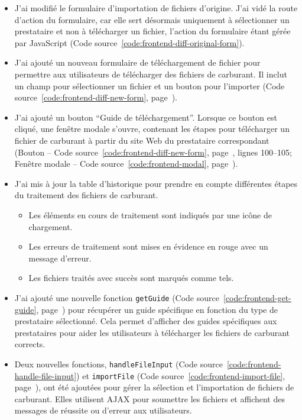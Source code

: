 \begin{itemize}
    \item J'ai modifié le formulaire d'importation de fichiers d'origine. J'ai vidé la route d'action du formulaire, car elle sert désormais uniquement à sélectionner un prestataire et non à télécharger un fichier, l'action du formulaire étant gérée par JavaScript (Code source~\ref{code:frontend-diff-original-form}).
    \item J'ai ajouté un nouveau formulaire de téléchargement de fichier pour permettre aux utilisateurs de télécharger des fichiers de carburant. Il inclut un champ pour sélectionner un fichier et un bouton pour l'importer (Code source~\ref{code:frontend-diff-new-form}, page~\pageref{code:frontend-diff-new-form}).
    \item J'ai ajouté un bouton \foreignquote{french}{Guide de téléchargement}. Lorsque ce bouton est cliqué, une fenêtre modale s'ouvre, contenant les étapes pour télécharger un fichier de carburant à partir du site Web du prestataire correspondant (Bouton -- Code source~\ref{code:frontend-diff-new-form}, page~\pageref{code:frontend-diff-new-form}, lignes 100--105; Fenêtre modale -- Code source~\ref{code:frontend-modal}, page~\pageref{code:frontend-modal}).
    \item J'ai mis à jour la table d'historique pour prendre en compte différentes étapes du traitement des fichiers de carburant.
          \begin{itemize}
              \item Les éléments en cours de traitement sont indiqués par une icône de chargement.
              \item Les erreurs de traitement sont mises en évidence en rouge avec un message d'erreur.
              \item Les fichiers traités avec succès sont marqués comme tels.
          \end{itemize}
    \item J'ai ajouté une nouvelle fonction \Verb|getGuide| (Code source~\ref{code:frontend-get-guide}, page~\pageref{code:frontend-get-guide}) pour récupérer un guide spécifique en fonction du type de prestataire sélectionné. Cela permet d'afficher des guides spécifiques aux prestataires pour aider les utilisateurs à télécharger les fichiers de carburant corrects.
    \item Deux nouvelles fonctions, \Verb|handleFileInput| (Code source~\ref{code:frontend-handle-file-input}) et \Verb|importFile| (Code source~\ref{code:frontend-import-file}, page~\pageref{code:frontend-import-file}), ont été ajoutées pour gérer la sélection et l'importation de fichiers de carburant. Elles utilisent AJAX pour soumettre les fichiers et affichent des messages de réussite ou d'erreur aux utilisateurs.

\end{itemize}
